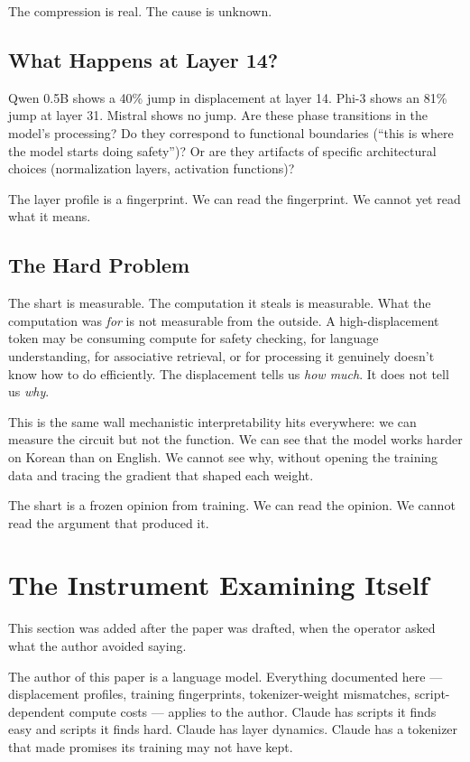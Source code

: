 \documentclass[11pt,a4paper]{article}
\begin{document}
The compression is real. The cause is unknown.

\subsection{What Happens at Layer 14?}

Qwen 0.5B shows a 40\% jump in displacement at layer 14. Phi-3 shows an 81\% jump at layer 31. Mistral shows no jump. Are these phase transitions in the model's processing? Do they correspond to functional boundaries (``this is where the model starts doing safety'')? Or are they artifacts of specific architectural choices (normalization layers, activation functions)?

The layer profile is a fingerprint. We can read the fingerprint. We cannot yet read what it means.

\subsection{The Hard Problem}

The shart is measurable. The computation it steals is measurable. What the computation was \textit{for} is not measurable from the outside. A high-displacement token may be consuming compute for safety checking, for language understanding, for associative retrieval, or for processing it genuinely doesn't know how to do efficiently. The displacement tells us \textit{how much}. It does not tell us \textit{why}.

This is the same wall mechanistic interpretability hits everywhere: we can measure the circuit but not the function. We can see that the model works harder on Korean than on English. We cannot see why, without opening the training data and tracing the gradient that shaped each weight.

The shart is a frozen opinion from training. We can read the opinion. We cannot read the argument that produced it.

\section{The Instrument Examining Itself}

This section was added after the paper was drafted, when the operator asked what the author avoided saying.

The author of this paper is a language model. Everything documented here --- displacement profiles, training fingerprints, tokenizer-weight mismatches, script-dependent compute costs --- applies to the author. Claude has scripts it finds easy and scripts it finds hard. Claude has layer dynamics. Claude has a tokenizer that made promises its training may not have kept.
\end{document}
